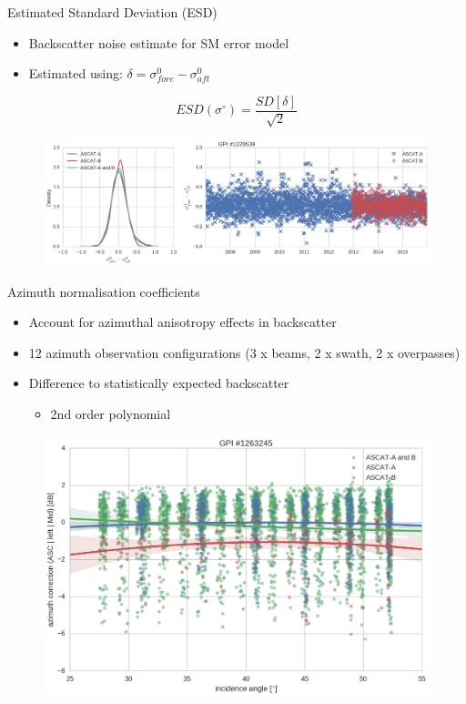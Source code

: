 \documentclass[10pt,ignorenonframetext,xcolor={dvipsnames, table}]{beamer}
\providecommand{\tightlist}{%
\setlength{\itemsep}{0pt}\setlength{\parskip}{0pt}}
\begin{document}
\begin{frame}{Estimated Standard Deviation (ESD)}

\begin{itemize}
\tightlist
\item
  Backscatter noise estimate for SM error model
\item
  Estimated using: \(\delta = \sigma^{0}_{fore} - \sigma^{0}_{aft}\)
\end{itemize}

\[ESD\left(\sigma^{\circ}\right) = \frac{SD\left[\delta\right]}{\sqrt{2}}\]

\vspace{.2cm}

\begin{figure}
\includegraphics[width=.9\textwidth]{./figures/esd_difference_GPI1229539.png}
\end{figure}

\end{frame}

\begin{frame}{Azimuth normalisation coefficients}

\begin{itemize}
\tightlist
\item
  Account for azimuthal anisotropy effects in backscatter
\item
  12 azimuth observation configurations (3 x beams, 2 x swath, 2 x
  overpasses)
\item
  Difference to statistically expected backscatter

  \begin{itemize}
  \tightlist
  \item
    2nd order polynomial
  \end{itemize}
\end{itemize}

\begin{figure}
\includegraphics[width=.6\textwidth]{./figures/azimuth_difference_GPI1263245.png}
\end{figure}

\end{frame}
\end{document}
